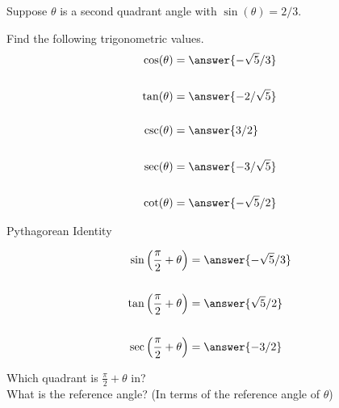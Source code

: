 \documentclass{ximera}
\author{Bobby Ramsey}
\begin{document}
\begin{exercise}
	Suppose $\theta$ is a second quadrant angle with $\sin(\theta)=2/3$.
	
	Find the following trigonometric values.
	\begin{align*}
		\cos(\theta) &= \answer{-\sqrt{5}/3}\\ \\
		\tan(\theta) &= \answer{-2/\sqrt{5}}\\ \\
		\csc(\theta) &= \answer{3/2}\\ \\
		\sec(\theta) &= \answer{-3/\sqrt{5}}\\ \\
		\cot(\theta) &= \answer{-\sqrt{5}/2}\\
	\end{align*}
	\begin{hint}
		Pythagorean Identity
	\end{hint}
	
	\begin{exercise}
	\begin{align*}
		\sin\left(\frac{\pi}{2}+\theta\right) &= \answer{-\sqrt{5}/3}\\ \\
		\tan\left(\frac{\pi}{2}+\theta\right) &= \answer{\sqrt{5}/2}\\ \\
		\sec\left(\frac{\pi}{2}+\theta\right) &= \answer{-3/2}\\
	\end{align*}
	\begin{hint}
		Which quadrant is $\frac{\pi}{2}+\theta$ in?  \\
		What is the reference angle? (In terms of the reference angle of $\theta$)
	\end{hint}
	\end{exercise}
\end{exercise}
\end{document}
